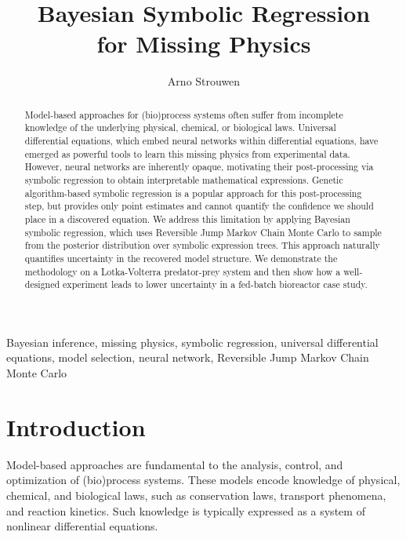 \documentclass{ifacconf}
\begin{document}
\thispagestyle{firstpage}
	\begin{frontmatter}
		
		\title{Bayesian Symbolic Regression \\ for Missing Physics} 
		
		\author[First,Second]{Arno Strouwen}
		
		\address[First]{Strouwen Statistics (e-mail: contact@arnostrouwen.com)}
		\address[Second]{Biosystems Department, 
			KULeuven, Leuven, Belgium}
		\begin{abstract} %
			Model-based approaches for (bio)process systems often suffer from incomplete knowledge of the underlying physical, chemical, or biological laws.
			Universal differential equations, which embed neural networks within differential equations, have emerged as powerful tools to learn this missing physics from experimental data.
			However, neural networks are inherently opaque, motivating their post-processing via symbolic regression to obtain interpretable mathematical expressions.
			Genetic algorithm-based symbolic regression is a popular approach for this post-processing step, but provides only point estimates and cannot quantify the confidence we should place in a discovered equation.
			We address this limitation by applying Bayesian symbolic regression, which uses Reversible Jump Markov Chain Monte Carlo to sample from the posterior distribution over symbolic expression trees.
			This approach naturally quantifies uncertainty in the recovered model structure.
			We demonstrate the methodology on a Lotka-Volterra predator-prey system and then show how a well-designed experiment leads to lower uncertainty in a fed-batch bioreactor case study.
		\end{abstract}
		
		\begin{keyword}
			Bayesian inference, missing physics, symbolic regression, universal differential equations, model selection, neural network, Reversible Jump Markov Chain Monte Carlo
		\end{keyword}
		
	\end{frontmatter}

	\section{Introduction}
	Model-based approaches are fundamental to the analysis, control, and optimization of (bio)process systems.
	These models encode knowledge of physical, chemical, and biological laws, such as conservation laws, transport phenomena, and reaction kinetics.
	Such knowledge is typically expressed as a system of nonlinear differential equations.
	
\end{document}
